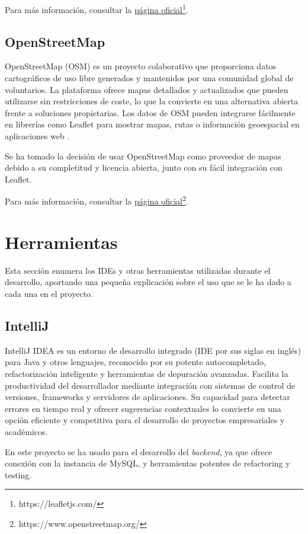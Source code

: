 \noindent Para más información, consultar la \href{https://leafletjs.com/}{\uline{página oficial}\footnote{\url{https://leafletjs.com/}}}.

\subsection{OpenStreetMap}
OpenStreetMap (OSM) es un proyecto colaborativo que proporciona datos cartográficos de uso libre generados y mantenidos por una comunidad global de voluntarios. La plataforma ofrece mapas detallados y actualizados que pueden utilizarse sin restricciones de coste, lo que la convierte en una alternativa abierta frente a soluciones propietarias. Los datos de OSM pueden integrarse fácilmente en librerías como Leaflet para mostrar mapas, rutas o información geoespacial en aplicaciones web \cite{openstreetmap}.

Se ha tomado la decisión de usar OpenStreetMap como proveedor de mapas debido a su completitud y licencia abierta, junto con su fácil integración con Leaflet.

\noindent Para más información, consultar la \href{https://www.openstreetmap.org/}{\uline{página oficial}\footnote{\url{https://www.openstreetmap.org/}}}.

\section{Herramientas}
Esta sección enumera los IDEs y otras herramientas utilizadas durante el desarrollo, aportando una pequeña explicación sobre el uso que se le ha dado a cada una en el proyecto.

\subsection{IntelliJ}
IntelliJ IDEA es un entorno de desarrollo integrado (IDE por sus siglas en inglés) para Java y otros lenguajes, reconocido por su potente autocompletado, refactorización inteligente y herramientas de depuración avanzadas. Facilita la productividad del desarrollador mediante integración con sistemas de control de versiones, frameworks y servidores de aplicaciones. Su capacidad para detectar errores en tiempo real y ofrecer sugerencias contextuales lo convierte en una opción eficiente y competitiva para el desarrollo de proyectos empresariales y académicos.

En este proyecto se ha usado para el desarrollo del \textit{backend}, ya que ofrece conexión con la instancia de MySQL, y herramientas potentes de refactoring y testing.

